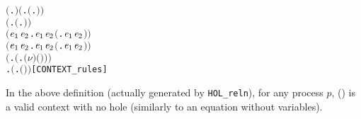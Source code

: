 \begin{alltt}
\HOLTokenTurnstile{}  \ensuremath{(}\HOLTokenLambda{}. \ensuremath{)} \HOLSymConst{\HOLTokenConj{}} \ensuremath{(}\HOLSymConst{\HOLTokenForall{}}.  \ensuremath{(}\HOLTokenLambda{}. \ensuremath{)}\ensuremath{)} \HOLSymConst{\HOLTokenConj{}}
   \ensuremath{(}\HOLSymConst{\HOLTokenForall{}} .   \HOLSymConst{\HOLTokenImp{}}  \ensuremath{(}\HOLTokenLambda{}. \HOLSymConst{\ensuremath{\ldotp}} \ensuremath{)}\ensuremath{)} \HOLSymConst{\HOLTokenConj{}}
   \ensuremath{(}\HOLSymConst{\HOLTokenForall{}}\ensuremath{\HOLBoundVar{e}\sb{\mathrm{1}}} \ensuremath{\HOLBoundVar{e}\sb{\mathrm{2}}}.  \ensuremath{\HOLBoundVar{e}\sb{\mathrm{1}}} \HOLSymConst{\HOLTokenConj{}}  \ensuremath{\HOLBoundVar{e}\sb{\mathrm{2}}} \HOLSymConst{\HOLTokenImp{}}  \ensuremath{(}\HOLTokenLambda{}. \ensuremath{\HOLBoundVar{e}\sb{\mathrm{1}}}  \HOLSymConst{\ensuremath{+}} \ensuremath{\HOLBoundVar{e}\sb{\mathrm{2}}} \ensuremath{)}\ensuremath{)} \HOLSymConst{\HOLTokenConj{}}
   \ensuremath{(}\HOLSymConst{\HOLTokenForall{}}\ensuremath{\HOLBoundVar{e}\sb{\mathrm{1}}} \ensuremath{\HOLBoundVar{e}\sb{\mathrm{2}}}.  \ensuremath{\HOLBoundVar{e}\sb{\mathrm{1}}} \HOLSymConst{\HOLTokenConj{}}  \ensuremath{\HOLBoundVar{e}\sb{\mathrm{2}}} \HOLSymConst{\HOLTokenImp{}}  \ensuremath{(}\HOLTokenLambda{}. \ensuremath{\HOLBoundVar{e}\sb{\mathrm{1}}}  \HOLSymConst{\ensuremath{\mid}} \ensuremath{\HOLBoundVar{e}\sb{\mathrm{2}}} \ensuremath{)}\ensuremath{)} \HOLSymConst{\HOLTokenConj{}}
   \ensuremath{(}\HOLSymConst{\HOLTokenForall{}} .   \HOLSymConst{\HOLTokenImp{}}  \ensuremath{(}\HOLTokenLambda{}. \ensuremath{(\nu}\ensuremath{)} \ensuremath{(} \ensuremath{)}\ensuremath{)}\ensuremath{)} \HOLSymConst{\HOLTokenConj{}}
   \HOLSymConst{\HOLTokenForall{}} .   \HOLSymConst{\HOLTokenImp{}}  \ensuremath{(}\HOLTokenLambda{}.  \ensuremath{(} \ensuremath{)} \ensuremath{)}\hfill{[CONTEXT_rules]}
\end{alltt}
In the above definition (actually generated by
\texttt{HOL_reln}), for any process $p$, () is a
valid context with no hole (similarly to an equation without variables).

